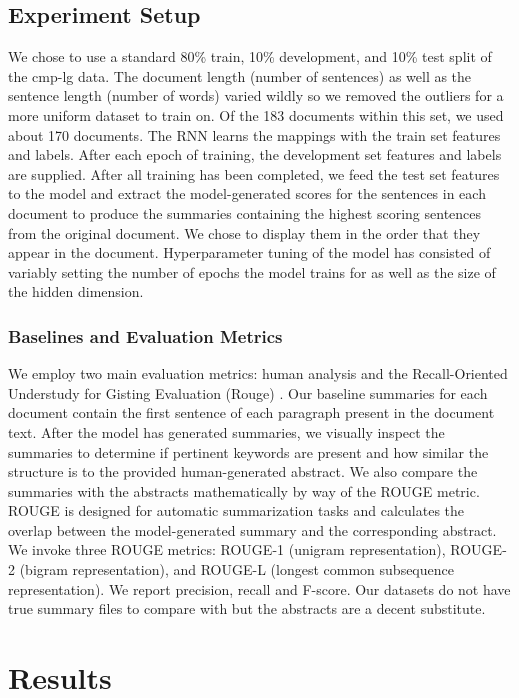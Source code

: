 \documentclass[11pt]{article}
\begin{document}
	\subsection{Experiment Setup} 
		We chose to use a standard 80\% train, 10\% development, and 10\% test split of the cmp-lg data. The document length (number of sentences) as well as the sentence length (number of words) varied wildly so we removed the outliers for a more uniform dataset to train on. Of the 183 documents within this set, we used about 170 documents.
		The RNN learns the mappings with the train set features and labels. After each epoch of training, the development set features and labels are supplied. After all training has been completed, we feed the test set features to the model and extract the model-generated scores for the sentences in each document to produce the summaries containing the highest scoring sentences from the original document. We chose to display them in the order that they appear in the document. Hyperparameter tuning of the model has consisted of variably setting the number of epochs the model trains for as well as the size of the hidden dimension. 
		\subsubsection{Baselines and Evaluation Metrics}
			We employ two main evaluation metrics: human analysis and the Recall-Oriented Understudy for Gisting Evaluation (Rouge) \cite{ganesan2015}. Our baseline summaries for each document contain the first sentence of each paragraph present in the document text. After the model has generated summaries, we visually inspect the summaries to determine if pertinent keywords are present and how similar the structure is to the provided human-generated abstract. We also compare the summaries with the abstracts mathematically by way of the ROUGE metric. ROUGE is designed for automatic summarization tasks and calculates the overlap between the model-generated summary and the corresponding abstract. We invoke three ROUGE metrics: ROUGE-1 (unigram representation), ROUGE-2 (bigram representation), and ROUGE-L (longest common subsequence representation). We report precision, recall and F-score. Our datasets do not have true summary files to compare with but the abstracts are a decent substitute.
			
\section{Results} %
\end{document}
